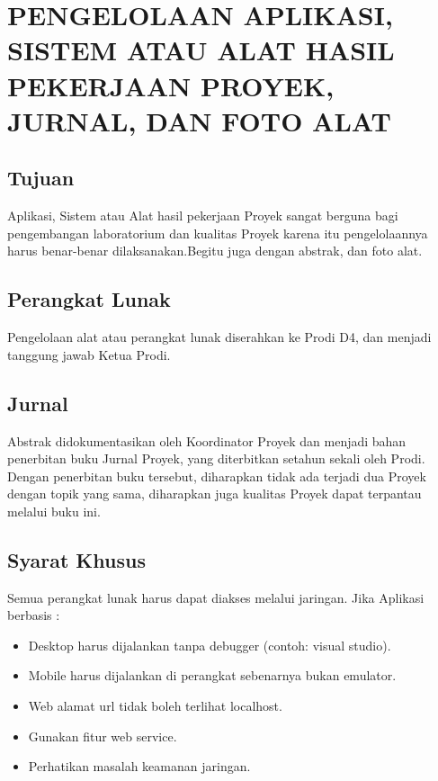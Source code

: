 \chapter{PENGELOLAAN APLIKASI, SISTEM ATAU ALAT HASIL PEKERJAAN
PROYEK, JURNAL, DAN FOTO ALAT}

\section{Tujuan}
Aplikasi,	 Sistem	 atau	 Alat	 hasil	 pekerjaan	 Proyek	 sangat	 berguna	 bagi	 pengembangan	
laboratorium	 dan	 kualitas	 Proyek	 karena	 itu	 pengelolaannya	 harus	 benar-benar	
dilaksanakan.Begitu	juga	dengan	abstrak,	dan	foto	alat.

\section{Perangkat Lunak}
Pengelolaan	 alat	 atau	 perangkat	 lunak	 diserahkan	 ke	 Prodi	 D4,	 dan	 menjadi tanggung	
jawab	Ketua	Prodi.

\section{Jurnal}
Abstrak	 didokumentasikan	 oleh	 Koordinator	 Proyek	 dan	menjadi	 bahan	 penerbitan	 buku	Jurnal Proyek,	 yang	 diterbitkan	 setahun	 sekali	 oleh	 Prodi.	 Dengan	 penerbitan	 buku	
tersebut,	 diharapkan	 tidak	 ada	 terjadi	 dua	 Proyek	 dengan	 topik	 yang	 sama,	 diharapkan	juga	kualitas	Proyek	dapat	terpantau	melalui	buku	ini.

\section{Syarat Khusus}
Semua	perangkat	lunak	harus	dapat	diakses	melalui	jaringan.	Jika	Aplikasi	berbasis	:
\begin{itemize}
\item Desktop	harus	dijalankan	tanpa	debugger	(contoh:	visual	studio).
\item Mobile	harus	 dijalankan	di	perangkat	sebenarnya	bukan	emulator.
\item Web	alamat	url	tidak	boleh	terlihat	localhost.
\item Gunakan	fitur	web	service.
\item Perhatikan	masalah	keamanan	jaringan.
\end{itemize}
